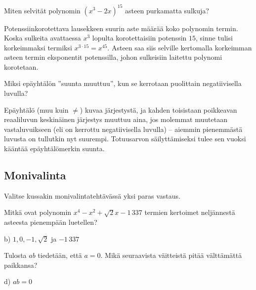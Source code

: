 \begin{tehtava}
Miten selvität polynomin $(x^3-2x)^{15}$ asteen purkamatta sulkuja?
	\begin{vastaus}
Potenssiinkorotettava lausekkeen suurin aste määrää koko polynomin termin. Koska sulkeita avattaessa $x^3$ lopulta korotettaisiin potenssin $15$, sinne tulisi korkeimmaksi termiksi $x^{3\cdot 15}=x^{45}$. Asteen saa siis selville kertomalla korkeimman asteen termin eksponentit potenssilla, johon sulkeisiin laitettu polynomi korotetaan.
	\end{vastaus}
\end{tehtava}

\begin{tehtava}
Miksi epäyhtälön ''suunta muuttuu'', kun se kerrotaan puolittain negatiivisella luvulla?
	\begin{vastaus}
Epäyhtälö (muu kuin $\neq$) kuvaa järjestystä, ja kahden toisistaan poikkeavan reaaliluvun keskinäinen järjestys muuttuu aina, jos molemmat muutetaan vastaluvuikseen (eli on kerrottu negatiivisella luvulla) -- aiemmin pienemmästä luvusta on tullutkin nyt suurempi. Totuusarvon säilyttämiseksi tulee sen vuoksi kääntää epäyhtälömerkin suunta.
	\end{vastaus}
\end{tehtava}

\subsection*{Monivalinta}

Valitse kussakin monivalintatehtävässä yksi paras vastaus.

\begin{tehtava}
Mitkä ovat polynomin $x^4-x^2+\sqrt{2}x-1\,337$ termien kertoimet neljännestä asteesta pienempään luetellen?
	\begin{vastaus}
	b) $1, 0, -1, \sqrt{2}$ ja $-1\,337$
	\end{vastaus}
\end{tehtava}

\begin{tehtava}
Tulosta $ab$ tiedetään, että $a = 0$. Mikä seuraavista väitteistä pitää välttämättä paikkansa?
		\begin{vastaus}
d) $ab = 0$
	\end{vastaus}
\end{tehtava}

